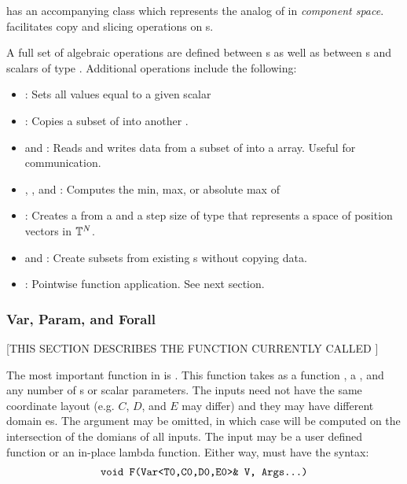 \documentclass[12pt]{article}
\begin{document}
 has an accompanying class  which represents the analog of  in \textit{component space}.  facilitates copy and slicing operations on s.

A full set of algebraic operations are defined between s as well as between s and scalars of type . Additional operations include the following:

\begin{itemize}
\item {}: Sets all values equal to a given scalar
\item {}: Copies a subset of  into another .
\item {} and : Reads and writes data from a subset of  into a  array. Useful for communication. 
\item {}, , and : Computes the min, max, or absolute max of 
\item {}: Creates a  from a  and a step size of type  that represents a space of position vectors in $\mathbb{T}^N$.
\item {} and : Create  subsets from existing s without copying data. 
\item {}: Pointwise function application. See next section.
\end{itemize}

\subsubsection{Var, Param, and Forall}

[THIS SECTION DESCRIBES THE FUNCTION CURRENTLY CALLED ]

The most important function in  is . This function takes as a function , a , and any 
number of s or scalar parameters. The  inputs need not have the same coordinate layout (e.g. $C$, $D$, and $E$ may differ) and they may have different domain es. The  argument may be omitted, in which case  will be computed on the intersection of the domians of all  inputs. The input  may be a user defined function or an in-place lambda function. Either way,  must have the syntax:
\begin{align*}
\text{\texttt{void F(Var<T0,C0,D0,E0>\& V, Args...)}}
\end{align*}
\end{document}
